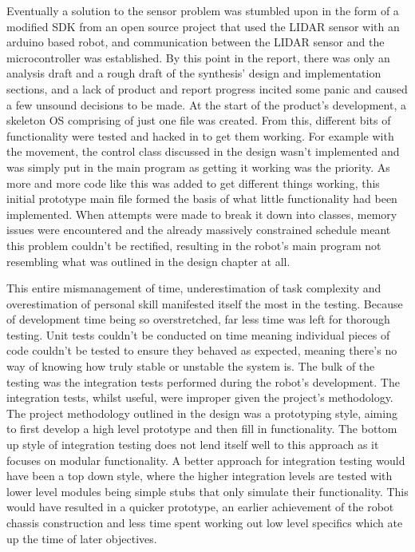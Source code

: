 		Eventually a solution to the sensor problem was stumbled upon in the form of a modified SDK from an open source project that used the LIDAR sensor with an arduino based robot, and communication between the LIDAR sensor and the microcontroller was established. By this point in the report, there was only an analysis draft and a rough draft of the synthesis' design and implementation sections, and a lack of product and report progress incited some panic and caused a few unsound decisions to be made. At the start of the product's development, a skeleton OS comprising of just one file was created. From this, different bits of functionality were tested and hacked in to get them working. For example with the movement, the control class discussed in the design wasn't implemented and was simply put in the main program as getting it working was the priority. As more and more code like this was added to get different things working, this initial prototype main file formed the basis of what little functionality had been implemented. When attempts were made to break it down into classes, memory issues were encountered and the already massively constrained schedule meant this problem couldn't be rectified, resulting in the robot's main program not resembling what was outlined in the design chapter at all.
		
		This entire mismanagement of time, underestimation of task complexity and overestimation of personal skill manifested itself the most in the testing. Because of development time being so overstretched, far less time was left for thorough testing. Unit tests couldn't be conducted on time meaning individual pieces of code couldn't be tested to ensure they behaved as expected, meaning there's no way of knowing how truly stable or unstable the system is. The bulk of the testing was the integration tests performed during the robot's development. The integration tests, whilst useful, were improper given the project's methodology. The project methodology outlined in the design was a prototyping style, aiming to first develop a high level prototype and then fill in functionality. The bottom up style of integration testing does not lend itself well to this approach as it focuses on modular functionality. A better approach for integration testing would have been a top down style, where the higher integration levels are tested with lower level modules being simple stubs that only simulate their functionality. This would have resulted in a quicker prototype, an earlier achievement of the robot chassis construction and less time spent working out low level specifics which ate up the time of later objectives.
		
